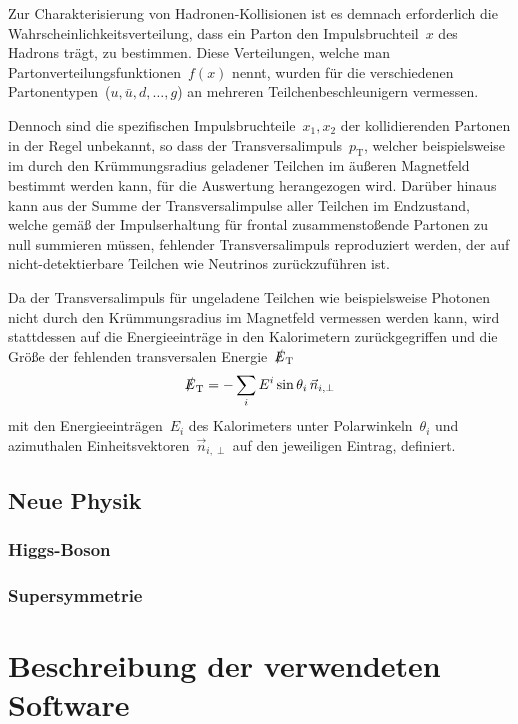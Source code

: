 \documentclass[11pt, a4paper]{article}
\numberwithin{equation}{section}
\begin{document}
Zur Charakterisierung von Hadronen-Kollisionen ist es demnach erforderlich die Wahrscheinlichkeitsverteilung, dass ein Parton den Impulsbruchteil~$x$ des Hadrons trägt, zu bestimmen.
Diese Verteilungen, welche man Partonverteilungsfunktionen~$f(x)$ nennt, wurden für die verschiedenen Partonentypen~($u, \bar{u}, d, \dots, g$) an mehreren Teilchenbeschleunigern vermessen.

Dennoch sind die spezifischen Impulsbruchteile~$x_1, x_2$ der kollidierenden Partonen in der Regel unbekannt, so dass der Transversalimpuls~$p_\mathrm{T}$, welcher beispielsweise im durch den Krümmungsradius geladener Teilchen im äußeren Magnetfeld bestimmt werden kann, für die Auswertung herangezogen wird.
Darüber hinaus kann aus der Summe der Transversalimpulse aller Teilchen im Endzustand, welche gemäß der Impulserhaltung für frontal zusammenstoßende Partonen zu null summieren müssen, fehlender Transversalimpuls reproduziert werden, der auf nicht-detektierbare Teilchen wie Neutrinos zurückzuführen ist.

Da der Transversalimpuls für ungeladene Teilchen wie beispielsweise Photonen nicht durch den Krümmungsradius im Magnetfeld vermessen werden kann, wird stattdessen auf die Energieeinträge in den Kalorimetern zurückgegriffen und die Größe der fehlenden transversalen Energie~$\slashed{E}_\mathrm{T}$
\begin{align*}
	\slashed{E}_\mathrm{T} = - \sum_{i} E^i \sin\theta_i \, \vec{n}_{i,\perp}
\end{align*}
mit den Energieeinträgen~$E_i$ des Kalorimeters unter Polarwinkeln~$\theta_i$  und azimuthalen Einheitsvektoren~$\vec{n}_{i,\perp}$ auf den jeweiligen Eintrag, definiert.



\subsection{Neue Physik}

\subsubsection{Higgs-Boson}

\subsubsection{Supersymmetrie}


\section{Beschreibung der verwendeten Software}
\end{document}
